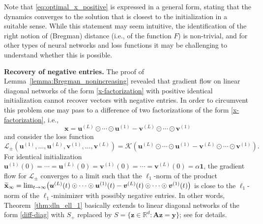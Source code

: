 \documentclass{svproc}
\newcommand{\corr}[1]{#1}
\newcommand{\bA}{\boldsymbol{A}}
\newcommand{\bu}{\boldsymbol{u}}
\newcommand{\bv}{\boldsymbol{v}}
\newcommand{\bx}{\boldsymbol{x}}
\newcommand{\by}{\boldsymbol{y}}
\newcommand{\bz}{\boldsymbol{z}}
\newcommand{\0}{\boldsymbol{0}}
\newcommand{\1}{\boldsymbol{1}}
\renewcommand{\tilde}{\widetilde}
\def\R{\mathbb{R}}
\def\Ldln{\mathcal{L}_\text{dln}}
\def\xprod{\tilde{\bf x}}
\begin{document}
Note that \eqref{eq:optimal_x_positive} is expressed in a general form, stating that the dynamics converges to the solution that is closest to the initialization in a suitable sense. 
While this statement may seem intuitive, the identification of the right notion of (Bregman) distance (i.e., of the function $F$) is non-trivial, and for other types of neural networks and loss functions it may be challenging to understand whether this is possible. 


\medskip

{\textbf{Recovery of negative entries.}}
The proof of Lemma~\ref{lemma:Bregman_nonincreasing} revealed that gradient flow on linear diagonal networks of the form 
\eqref{x-factorization} with positive identical initialization 
cannot recover vectors with negative entries. In order to circumvent this problem one may pass to a difference of two factorizations of the form \eqref{x-factorization}, i.e.,
\begin{equation}\label{diff-diag}
\bx = \bu^{(L)} \odot \cdots \odot \bu^{(1)} - \bv^{(L)} \odot \cdots \odot \bv^{(1)}
\end{equation}
and consider the loss function
\[
\mathcal{L}_{\pm}(\bu^{(1)}, \hdots, \bu^{(L)},\bv^{(1)},\hdots,\bv^{(L)}) = \mathcal{K}(\bu^{(L)} \odot \cdots \odot \bu^{(1)} - \bv^{(L)} \odot \cdots \odot \bv^{(1)}).
\]
For identical initialization
\corr{$\bu^{(1)}(0) = \cdots = \bu^{(L)}(0) = \bv^{(1)}(0) = \cdots = \bv^{(L)}(0) = \alpha \1$}, the gradient flow for $\mathcal{L}_{\pm}$ converges to a limit such that the $\ell_1$-norm of the product \corr{$\xprod_\infty = \lim_{t \to \infty}\bigl(\bu^{(L)}(t) \odot \cdots \odot \bu^{(1)}(t) - \bv^{(L)}(t) \odot \cdots \odot \bv^{(1)}(t)\bigr)$} is close to the $\ell_1$-norm of the $\ell_1$-minimizer with possibly \corr{negative} entries. In other words, Theorem~\ref{thm:dln_ell_1} basically extends to linear diagonal networks of the form \eqref{diff-diag} with $S_+$ replaced by $S = \{\bz \in \R^d : \bA \corr{\bz} = \by\}$\corr{;} see \cite[Theorem~1.1]{chou2023more} for details.
\end{document}
